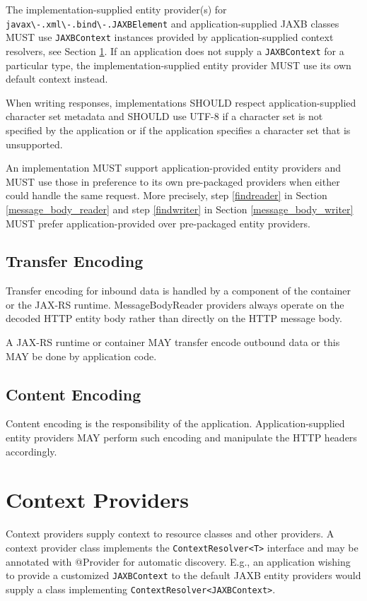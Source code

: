 The implementation-supplied entity provider(s) for \lstinline{javax\-.xml\-.bind\-.JAXBElement} and application-supplied
JAXB classes MUST use \lstinline{JAXBContext} instances provided by application-supplied context resolvers, see
Section \ref{contextprovider}. If an application does not supply a \lstinline{JAXBContext} for a particular type, the
implementation-supplied entity provider MUST use its own default context instead.

When writing responses, implementations SHOULD respect application-supplied character set metadata and SHOULD use UTF-8
if a character set is not specified by the application or if the application specifies a character set that is
unsupported.

An implementation MUST support application-provided entity providers and MUST use those in preference to its own
pre-packaged providers when either could handle the same request. More precisely, step \ref{findreader} in Section
\ref{message_body_reader} and step \ref{findwriter} in Section \ref{message_body_writer} MUST prefer
application-provided over pre-packaged entity providers.

\subsection{Transfer Encoding}
\label{transfer_encoding}

Transfer encoding for inbound data is handled by a component of the container or the JAX-RS runtime. MessageBodyReader
providers always operate on the decoded HTTP entity body rather than directly on the HTTP message body.

A JAX-RS runtime or container MAY transfer encode outbound data or this MAY be done by application code.

\subsection{Content Encoding}

Content encoding is the responsibility of the application. Application-supplied entity providers MAY perform such
encoding and manipulate the HTTP headers accordingly.

\section{Context Providers}
\label{contextprovider}

Context providers supply context to resource classes and other providers. A context provider class implements the
\lstinline{ContextResolver<T>} interface and may be annotated with @Provider for automatic discovery. E.g.,
an application wishing to provide a customized \lstinline{JAXBContext} to the default JAXB entity providers would supply
a class implementing \lstinline{ContextResolver<JAXBContext>}.

